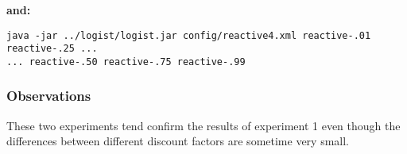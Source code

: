 \documentclass[11pt]{article}
\begin{document}
\textbf{and:}
\begin{verbatim}
java -jar ../logist/logist.jar config/reactive4.xml reactive-.01 reactive-.25 ... 
... reactive-.50 reactive-.75 reactive-.99
\end{verbatim}

\subsubsection{Observations}
These two experiments tend confirm the results of experiment 1 even though the differences between different discount factors are sometime very small.
\end{document}
